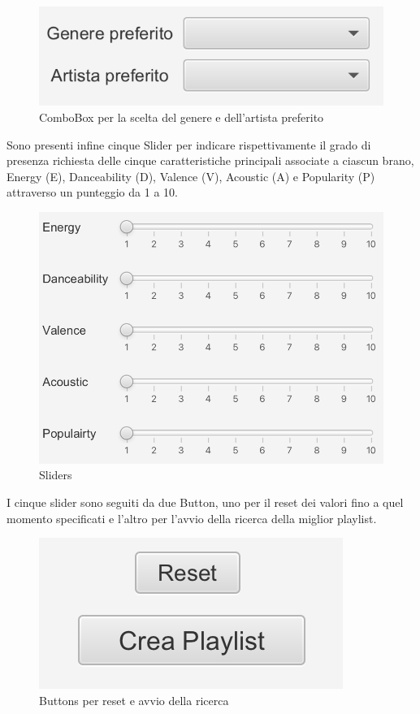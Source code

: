 \documentclass[12pt, a4paper]{article}
\begin{document}
\begin{figure}[h]
  \centering
  \includegraphics[width=0.5\linewidth]{images/surpriseme_genre_artist.png}
  \caption{ComboBox per la scelta del genere e dell'artista preferito}
\end{figure}

\newpage
Sono presenti infine cinque Slider per indicare rispettivamente il grado di presenza richiesta delle cinque caratteristiche principali associate a ciascun brano, Energy (E), Danceability (D), Valence (V), Acoustic (A) e Popularity (P) attraverso un punteggio da 1 a 10. 

\begin{figure}[h]
  \centering
  \includegraphics[width=0.8\linewidth]{images/sliders.png}
  \caption{Sliders}
\end{figure}

I cinque slider sono seguiti da due Button, uno per il reset dei valori fino a quel momento specificati e l'altro per l'avvio della ricerca della miglior playlist.

\begin{figure}[h]
  \centering
  \includegraphics[width=0.3\linewidth]{images/surpriseme_buttons.png}
  \caption{Buttons per reset e avvio della ricerca}
\end{figure}
\end{document}
